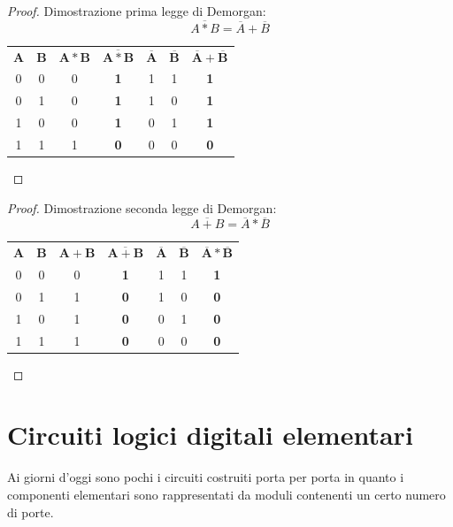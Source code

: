 \documentclass[12pt]{report}
\begin{document}
			\begin{proof}{Dimostrazione prima legge di Demorgan: \[
					\overline{A * B} = \overline{A} + \overline{B}
					\]}
			\begin{center}
			\begin{tabular}{c|c|c|c|c|c|c}
				$\mathbf{A}$ & $\mathbf{B}$ & $\mathbf{A * B}$ & $\mathbf{\overline{A * B}}$ & $\mathbf{\overline{A}}$ & $\mathbf{\overline{B}}$ & $\mathbf{\overline{A} + \overline{B}}$ \\
				0 & 0 & 0 & \color{red}\textbf{1} & 1 & 1 & \color{red}\textbf{1}\\
				0 & 1 & 0 & \color{red}\textbf{1} & 1 & 0 & \color{red}\textbf{1}\\
				1 & 0 & 0 & \color{red}\textbf{1} & 0 & 1 & \color{red}\textbf{1}\\
				1 & 1 & 1 & \color{red}\textbf{0} & 0 & 0 & \color{red}\textbf{0}\\
			\end{tabular}
			\end{center}
			\end{proof}
			\begin{proof}{Dimostrazione seconda legge di Demorgan: \[
					\overline{A + B} = \overline{A} * \overline{B}
					\]}
				\begin{center}
					\begin{tabular}{c|c|c|c|c|c|c}
						$\mathbf{A}$ & $\mathbf{B}$ & $\mathbf{A + B}$ & $\mathbf{\overline{A + B}}$ & $\mathbf{\overline{A}}$ & $\mathbf{\overline{B}}$ & $\mathbf{\overline{A} * \overline{B}}$ \\
						0 & 0 & 0 & \color{red}\textbf{1} & 1 & 1 & \color{red}\textbf{1}\\
						0 & 1 & 1 & \color{red}\textbf{0} & 1 & 0 & \color{red}\textbf{0}\\
						1 & 0 & 1 & \color{red}\textbf{0} & 0 & 1 & \color{red}\textbf{0}\\
						1 & 1 & 1 & \color{red}\textbf{0} & 0 & 0 & \color{red}\textbf{0}\\
					\end{tabular}
				\end{center}
			\end{proof}
			\section{Circuiti logici digitali elementari}
			Ai giorni d'oggi sono pochi i circuiti costruiti porta per porta in quanto i componenti elementari sono rappresentati da moduli contenenti un certo numero di porte.
\end{document}
